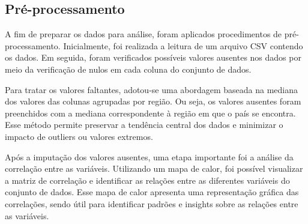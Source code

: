 \documentclass[conference]{IEEEtran}
\begin{document}
\begin{figure}[htbp]
  \centering
  \begin{floatrow}
  \end{floatrow}
\end{figure}

\subsection{Pré-processamento}

A fim de preparar os dados para análise, foram aplicados procedimentos de pré-processamento. Inicialmente, foi realizada a leitura de um arquivo CSV contendo os dados. Em seguida, foram verificados possíveis valores ausentes nos dados por meio da verificação de nulos em cada coluna do conjunto de dados.

Para tratar os valores faltantes, adotou-se uma abordagem baseada na mediana dos valores das colunas agrupadas por região. Ou seja, os valores ausentes foram preenchidos com a mediana correspondente à região em que o país se encontra. Esse método permite preservar a tendência central dos dados e minimizar o impacto de outliers ou valores extremos.

Após a imputação dos valores ausentes, uma etapa importante foi a análise da correlação entre as variáveis. Utilizando um mapa de calor, foi possível visualizar a matriz de correlação e identificar as relações entre as diferentes variáveis do conjunto de dados. Esse mapa de calor apresenta uma representação gráfica das correlações, sendo útil para identificar padrões e insights sobre as relações entre as variáveis.
\end{document}
